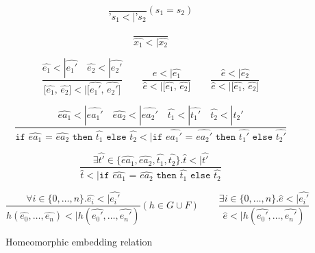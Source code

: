 \documentclass[10pt]{../sigplanconf}
\newcommand{\nfrac}[2]{\frac{\displaystyle{#1}}{\displaystyle{#2}}}
\newcommand{\tagsc}[1]{\tag{\scshape #1}}
\begin{document}
\begin{figure*}\centering
  \begin{equation}
    \nfrac{
    }{
      \texttt{'}s_1 <| \texttt{'}s_2
    } (s_1 = s_2) \tagsc{Atoms}
  \end{equation}

  \begin{equation}
    \nfrac{
    }{
      \widehat{x_1} <| \widehat{x_2}
    }\tagsc{Variables}
  \end{equation}

  \begin{equation}
    \nfrac{
      \widehat{e_1} <| \widehat{e_1'}\quad \widehat{e_2} <| \widehat{e_2'}
    }{
      \texttt{[$\widehat{e_1}$, $\widehat{e_2}$]} <| \texttt{[$\widehat{e_1'}$, $\widehat{e_2'}$]}
    }
    \qquad
    \nfrac{
      \widehat{e} <| \widehat{e_1}
    }{
      \widehat{e} <| \texttt{[$\widehat{e_1}$, $\widehat{e_2}$]}
    }
    \qquad
    \nfrac{
      \widehat{e} <| \widehat{e_2}
    }{
      \widehat{e} <| \texttt{[$\widehat{e_1}$, $\widehat{e_2}$]}
    }
    \tagsc{Cons}
  \end{equation}

  \begin{equation}
    \nfrac{
      \widehat{ea_1} <| \widehat{ea_1'} \quad \widehat{ea_2} <| \widehat{ea_2'} \quad \widehat{t_1} <| \widehat{t_1'} \quad \widehat{t_2} <| \widehat{t_2'}
    }{
      \texttt{if $\widehat{ea_1}$ = $\widehat{ea_2}$ then $\widehat{t_1}$ else $\widehat{t_2}$} <| \texttt{if $\widehat{ea_1'}$ = $\widehat{ea_2'}$ then $\widehat{t_1'}$ else $\widehat{t_2'}$}
    } \tagsc{If-A}
  \end{equation}

  \begin{equation}
    \nfrac{
      \exists \widehat{t'} \in \{\widehat{ea_1}, \widehat{ea_2}, \widehat{t_1}, \widehat{t_2}\}. \widehat{t} <| \widehat{t'}
    }{
      \widehat{t} <| \texttt{if $\widehat{ea_1}$ = $\widehat{ea_2}$ then $\widehat{t_1}$ else $\widehat{t_2}$}
    } \tagsc{If-B}
  \end{equation}

\begin{equation}
  \nfrac{
    \forall i \in \{0, \ldots, n\}. \widehat{e_i} <| \widehat{e_i'}
  }{
    h(\widehat{e_0}, \ldots, \widehat{e_n}) <| h(\widehat{e_0'}, \ldots, \widehat{e_n'})
  } (h \in G \cup F)
  \qquad
  \nfrac{
    \exists i \in \{0, \ldots, n\}. \widehat{e} <| \widehat{e_i'}
  }{
    \widehat{e} <| h(\widehat{e_0'}, \ldots, \widehat{e_n'})
  }
 \tagsc{Call}
\end{equation}

\caption{Homeomorphic embedding relation}
\label{fig:embedding}
\end{figure*}
\end{document}
